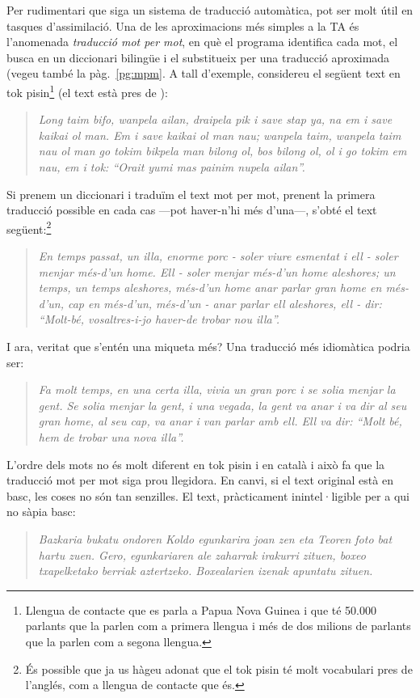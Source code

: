 Per rudimentari que siga un sistema de traducció automàtica, pot ser
molt útil en tasques d'assimilació. Una de les aproximacions més
simples a la TA és l'anomenada \emph{traducció mot per
  mot}, en què el programa identifica cada mot, el busca
en un diccionari bilingüe i el substitueix per una traducció
aproximada (vegeu també la pàg.~\ref{pg:mpm}. A tall d'exemple, considereu el següent text en tok
pisin\footnote{Llengua de contacte que es parla a Papua Nova Guinea i
  que té 50.000 parlants que la parlen com a primera llengua i més de
  dos milions de parlants que la parlen com a segona llengua.} (el
text està pres de \citealt{lyovin97b}):
\begin{quote}{\sl Long taim bifo, wanpela ailan, draipela pik i save
    stap ya, na em i save kaikai ol man. Em i save kaikai ol man nau;
    wanpela taim, wanpela taim nau ol man go tokim bikpela man bilong
    ol, bos bilong ol, ol i go tokim em nau, em i tok: ``Orait yumi
    mas painim nupela ailan''. }
\end{quote} 
Si prenem un diccionari i traduïm el text mot per mot, prenent la
primera traducció possible en cada cas ---pot haver-n'hi més d'una---,
s'obté el text següent:\footnote{És possible que ja us hàgeu adonat
  que el tok pisin té molt vocabulari pres de l'anglés, com a llengua
  de contacte que és.}
\begin{quote}{\sl En temps passat, un illa, enorme porc - soler viure
    esmentat i ell - soler menjar més-d'un home. Ell - soler menjar
    més-d'un home aleshores; un temps, un temps aleshores, més-d'un
    home anar parlar gran home en més-d'un, cap en més-d'un, més-d'un
    - anar parlar ell aleshores, ell - dir: ``Molt-bé, vosaltres-i-jo
    haver-de trobar nou illa''.}
\end{quote}
I ara, veritat que s'entén una miqueta més? Una traducció
més idiomàtica podria ser:
\begin{quote}{\sl Fa molt temps, en una certa illa, vivia un gran porc
    i se solia menjar la gent. Se solia menjar la gent, i una vegada,
    la gent va anar i va dir al seu gran home, al seu cap, va anar i
    van parlar amb ell. Ell va dir: ``Molt bé, hem de trobar una nova
    illa''.}
\end{quote}
L'ordre dels mots no és molt diferent en tok pisin i en català i això
fa que la traducció mot per mot siga prou llegidora. En canvi, si el
text original està en basc, les coses no són tan senzilles. El text,
pràcticament inintel·ligible per a qui no sàpia basc:
\begin{quote}{\sl Bazkaria bukatu ondoren Koldo egunkarira joan zen
    eta Teoren foto bat hartu zuen. Gero, egunkariaren ale zaharrak
    irakurri zituen, boxeo txapelketako berriak
    aztertzeko. Boxealarien izenak apuntatu zituen.}
\end{quote}
